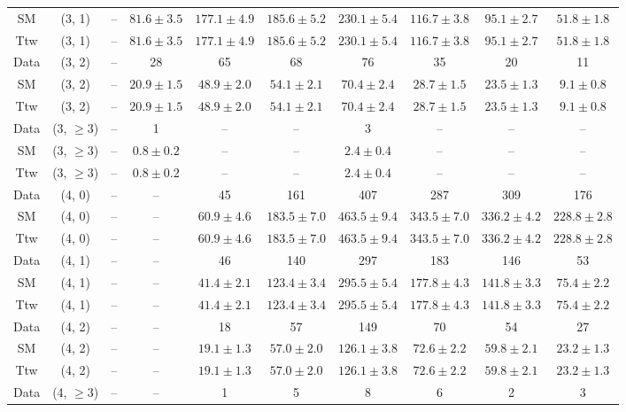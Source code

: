 \begin{table}[h!]
{\begin{tabular}{cccccccccc}
	SM & (3, 1) & -- & $81.6\pm 3.5$ & $177.1\pm 4.9$ & $185.6\pm 5.2$ & $230.1\pm 5.4$ & $116.7\pm 3.8$ & $95.1\pm 2.7$ & $51.8\pm 1.8$ \\[0.5ex] 
	Ttw & (3, 1) & -- & $81.6\pm 3.5$ & $177.1\pm 4.9$ & $185.6\pm 5.2$ & $230.1\pm 5.4$ & $116.7\pm 3.8$ & $95.1\pm 2.7$ & $51.8\pm 1.8$ \\[0.5ex] 
	Data & (3, 2) & -- & 28 & 65 & 68 & 76 & 35 & 20 & 11 \\[0.5ex] 
	SM & (3, 2) & -- & $20.9\pm 1.5$ & $48.9\pm 2.0$ & $54.1\pm 2.1$ & $70.4\pm 2.4$ & $28.7\pm 1.5$ & $23.5\pm 1.3$ & $9.1\pm 0.8$ \\[0.5ex] 
	Ttw & (3, 2) & -- & $20.9\pm 1.5$ & $48.9\pm 2.0$ & $54.1\pm 2.1$ & $70.4\pm 2.4$ & $28.7\pm 1.5$ & $23.5\pm 1.3$ & $9.1\pm 0.8$ \\[0.5ex] 
	Data & (3, $\ge3$) & -- & 1 & -- & -- & 3 & -- & -- & -- \\[0.5ex] 
	SM & (3, $\ge3$) & -- & $0.8\pm 0.2$ & -- & -- & $2.4\pm 0.4$ & -- & -- & -- \\[0.5ex] 
	Ttw & (3, $\ge3$) & -- & $0.8\pm 0.2$ & -- & -- & $2.4\pm 0.4$ & -- & -- & -- \\[0.5ex] 
	Data & (4, 0) & -- & -- & 45 & 161 & 407 & 287 & 309 & 176 \\[0.5ex] 
	SM & (4, 0) & -- & -- & $60.9\pm 4.6$ & $183.5\pm 7.0$ & $463.5\pm 9.4$ & $343.5\pm 7.0$ & $336.2\pm 4.2$ & $228.8\pm 2.8$ \\[0.5ex] 
	Ttw & (4, 0) & -- & -- & $60.9\pm 4.6$ & $183.5\pm 7.0$ & $463.5\pm 9.4$ & $343.5\pm 7.0$ & $336.2\pm 4.2$ & $228.8\pm 2.8$ \\[0.5ex] 
	Data & (4, 1) & -- & -- & 46 & 140 & 297 & 183 & 146 & 53 \\[0.5ex] 
	SM & (4, 1) & -- & -- & $41.4\pm 2.1$ & $123.4\pm 3.4$ & $295.5\pm 5.4$ & $177.8\pm 4.3$ & $141.8\pm 3.3$ & $75.4\pm 2.2$ \\[0.5ex] 
	Ttw & (4, 1) & -- & -- & $41.4\pm 2.1$ & $123.4\pm 3.4$ & $295.5\pm 5.4$ & $177.8\pm 4.3$ & $141.8\pm 3.3$ & $75.4\pm 2.2$ \\[0.5ex] 
	Data & (4, 2) & -- & -- & 18 & 57 & 149 & 70 & 54 & 27 \\[0.5ex] 
	SM & (4, 2) & -- & -- & $19.1\pm 1.3$ & $57.0\pm 2.0$ & $126.1\pm 3.8$ & $72.6\pm 2.2$ & $59.8\pm 2.1$ & $23.2\pm 1.3$ \\[0.5ex] 
	Ttw & (4, 2) & -- & -- & $19.1\pm 1.3$ & $57.0\pm 2.0$ & $126.1\pm 3.8$ & $72.6\pm 2.2$ & $59.8\pm 2.1$ & $23.2\pm 1.3$ \\[0.5ex] 
	Data & (4, $\ge3$) & -- & -- & 1 & 5 & 8 & 6 & 2 & 3 \\[0.5ex] 

\end{tabular}}
\end{table}
